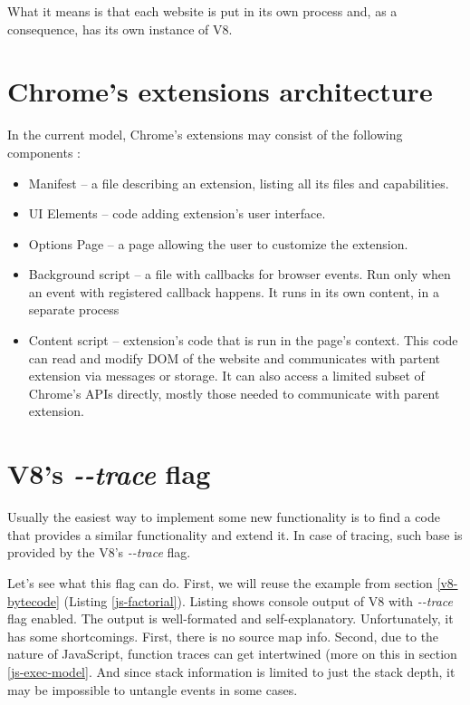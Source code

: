 What it means is that each website is put in its own process and, as a consequence, has
its own instance of V8.

\section{Chrome's extensions architecture}

In the current model, Chrome's extensions may consist of the following components \cite{chrome:extensions}:
\begin{itemize}
  \item Manifest -- a file describing an extension, listing all its files and capabilities.
  \item UI Elements -- code adding extension's user interface.
  \item Options Page -- a page allowing the user to customize the extension.
  \item Background script -- a file with callbacks for browser events. Run only when an event with registered callback happens.
           It runs in its own content, in a separate process
  \item Content script -- extension's code that is run in the page's context. This code can read and modify DOM
           of the website and communicates with partent extension via messages or storage.
           It can also access a limited subset of Chrome's APIs directly, mostly those needed to communicate
           with parent extension. \cite{chrome:content-scripts}
\end{itemize}

\section{V8's \emph{-{}-trace} flag}
Usually the easiest way to implement some new functionality is to find a code that provides a similar
functionality and extend it. In case of tracing, such base is provided by the V8's \emph{-{}-trace} flag.

Let's see what this flag can do. First, we will reuse the example from section \ref{v8-bytecode} (Listing \ref{js-factorial}).
Listing shows console output of V8 with \emph{-{}-trace} flag enabled. The output is well-formated and self-explanatory.
Unfortunately, it has some shortcomings. First, there is no source map info. Second, due to the nature of JavaScript,
function traces can get intertwined (more on this in section \ref{js-exec-model}. And since stack information is limited to
just the stack depth, it may be impossible to untangle events in some cases.

